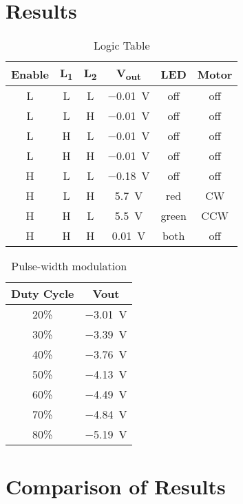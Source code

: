 \documentclass{article}
\begin{document}
\section{Results}
\label{sec:results}

\begin{table}[hbtp]
  \centering
  \begin{tabular}{ccc|ccc}
    Enable & \si{L_1} & \si{L_2} & \si{V_{out}} & LED & Motor \\
    \hline
    L & L & L & \SI{-0.01}{V} & off & off \\
    L & L & H & \SI{-0.01}{V} & off & off \\
    L & H & L & \SI{-0.01}{V} & off & off \\
    L & H & H & \SI{-0.01}{V} & off & off \\
    H & L & L & \SI{-0.18}{V} & off & off \\
    H & L & H & \SI{+5.7}{V} & red & CW \\
    H & H & L & \SI{+5.5}{V} & green & CCW \\
    H & H & H & \SI{+0.01}{V} & both & off \\
  \end{tabular}
  \caption{\label{tab:logic} Logic Table}
\end{table}

\begin{table}[hbtp]
  \centering
  \begin{tabular}{cc}
    Duty Cycle & Vout \\
    \hline
    20\% & \SI{-3.01}{V} \\
    30\% & \SI{-3.39}{V} \\
    40\% & \SI{-3.76}{V} \\
    50\% & \SI{-4.13}{V} \\
    60\% & \SI{-4.49}{V} \\
    70\% & \SI{-4.84}{V} \\
    80\% & \SI{-5.19}{V} \\
  \end{tabular}
  \caption{\label{tab:duty} Pulse-width modulation}
\end{table}

\section{Comparison of Results}
\label{sec:comp_of_res}

\end{document}
